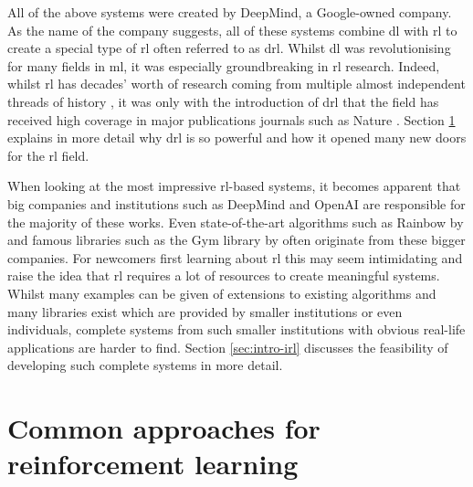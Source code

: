 All of the above systems were created by DeepMind, a Google-owned company.
As the name of the company suggests, all of these systems combine \gls{dl} with \gls{rl} to create a special type of \gls{rl} often referred to as \gls{drl}.
Whilst \gls{dl} was revolutionising for many fields in \gls{ml}, it was especially groundbreaking in \gls{rl} research.
Indeed, whilst \gls{rl} has decades' worth of research coming from multiple almost independent threads of history \citep[Section 1.6]{rl_intro_handbook}, it was only with the introduction of \gls{drl} that the field has received high coverage in major publications journals such as Nature \citep{rl_intro_handbook, alphago, alphago_zero, dqn}.
Section \ref{sec:intro-approaches} explains in more detail why \gls{drl} is so powerful and how it opened many new doors for the \gls{rl} field.

When looking at the most impressive \gls{rl}-based systems, it becomes apparent that big companies and institutions such as DeepMind and OpenAI are responsible for the majority of these works.
Even state-of-the-art algorithms such as Rainbow by \citet[DeepMind]{rainbow} and famous libraries such as the Gym library by \citet[OpenAI]{gym} often originate from these bigger companies.
For newcomers first learning about \gls{rl} this may seem intimidating and raise the idea that \gls{rl} requires a lot of resources to create meaningful systems.
Whilst many examples can be given of extensions to existing algorithms and many libraries exist which are provided by smaller institutions or even individuals, complete systems from such smaller institutions with obvious real-life applications are harder to find.
Section \ref{sec:intro-irl} discusses the feasibility of developing such complete systems in more detail.


\section{Common approaches for reinforcement learning}
\label{sec:intro-approaches}

